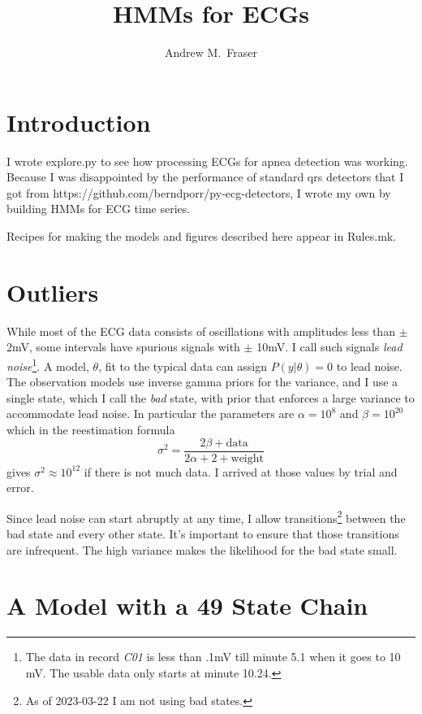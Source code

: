 \documentclass[12pt]{article}
\title{HMMs for ECGs}
\author{Andrew M.\ Fraser}
\begin{document}
\maketitle

\section{Introduction}
\label{sec:introduction}

I wrote explore.py to see how processing ECGs for apnea detection was
working.  Because I was disappointed by the performance of standard qrs
detectors that I got from
https://github.com/berndporr/py-ecg-detectors, I wrote my own by
building HMMs for ECG time series.

Recipes for making the models and figures described here appear in
Rules.mk.

\section{Outliers}
\label{sec:outliers}

While most of the ECG data consists of oscillations with amplitudes
less than $\pm$ 2mV, some intervals have spurious signals with $\pm$
10mV.  I call such signals \emph{lead noise}\footnote{The data in
  record \emph{C01} is less than .1mV till minute 5.1 when it goes to
  10 mV.  The usable data only starts at minute 10.24.}.  A model,
$\theta$, fit to the typical data can assign $P(y|\theta) = 0$ to lead
noise.  The observation models use inverse gamma priors for the
variance, and I use a single state, which I call the \emph{bad} state,
with prior that enforces a large variance to accommodate lead noise.
In particular the parameters are $\alpha=10^{8}$ and $\beta=10^{20}$
which in the reestimation formula
\begin{equation*}
  \sigma^2 = \frac{2 \beta + \text{data}}{2 \alpha +2 + \text{weight}}
\end{equation*}
gives $\sigma^2 \approx 10^{12}$ if there is not much data.  I arrived
at those values by trial and error.

Since lead noise can start abruptly at any time, I allow
transitions\footnote{As of 2023-03-22 I am not using bad states.}
between the bad state and every other state.  It's important to ensure
that those transitions are infrequent.  The high variance makes the
likelihood for the bad state small.

\section{A Model with a 49 State Chain}
\label{sec:mono20}
\end{document}
